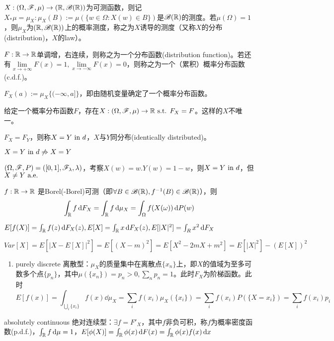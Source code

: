 \documentclass{ctexart}
\begin{document}
\begin{Eg}
  $X:(\Omega,\mathscr{F},\mu)\to(\mathbb{R},\mathscr{B}(\mathbb{R}))$为可测函数，则记$X_{*}\mu=\mu_{X}:\mu_{X}(B):=\mu(\{w\in\Omega:X(w)\in B\})$是$\mathscr{B}(\mathbb{R})$的测度。若$\mu(\Omega)=1$，则$\mu_{X}$为$(\mathbb{R},\mathscr{B}(\mathbb{R}))$上的概率测度，称之为$X$诱导的测度（又称$X$的分布(distribution)，$X$的law）。
\end{Eg}

\begin{Def}
  $F:\mathbb{R}\to\mathbb{R}$单调增，右连续，则称之为一个分布函数(distribution function)。若还有$\lim\limits_{x\to +\infty}F(x)=1,\lim\limits_{x\to -\infty}F(x)=0$，则称之为一个（累积）概率分布函数(c.d.f.)。

$F_{X}(a):=\mu_{X}\{(-\infty,a]\}$，即由随机变量确定了一个概率分布函数。
\end{Def}

\begin{Rmk}
  给定一个概率分布函数$F$，存在$X:(\Omega,\mathscr{F},\mu)\to\mathbb{R}\text{ s.t. } F_{X}=F$。这样的$X$不唯一。
\end{Rmk}

\begin{Def}
  $F_{X}=F_{Y}$，则称$X=Y\text{ in } d$，$X$与$Y$同分布(identically distributed)。
\end{Def}

$X=Y\text{ in } d\not\Rightarrow X=Y$
\begin{Eg}
  $(\Omega,\mathscr{F},P)=([0,1],\mathscr{F}_{\lambda},\lambda)$，考察$X(w)=w.Y(w)=1-w$，则$X=Y\text{ in } d$，但$X\neq Y\text{ a.e. }$
\end{Eg}

\begin{Thm}
  $f:\mathbb{R}\to\mathbb{R}$ 是Borel(-Borel)可测（即$\forall B\in \mathscr{B}(\mathbb{R}),f^{-1}(B)\in\mathscr{B}(\mathbb{R})$），则
  \[\int_{\mathbb{R}}f\,\mathrm{d} F_{X}=\int_{\mathbb{R}}f\,\mathrm{d}\mu_{X} =\int_{\Omega}f(X(\omega))\,\mathrm{d} P(w)\]
\end{Thm}

\begin{Eg}
  $E[f(X)]=\int_{\mathbb{R}}f(z)\,\mathrm{d} F_{X}(z), E[X]=\int_{\mathbb{R}}x\,\mathrm{d} F_{X}(z), E[|X|^{2}]=\int_{R}x^{2}\,\mathrm{d} F_{X}$

  $Var[X]=E[|X-E[X]|^{2}]=E[(X-m)^{2}]=E[X^{2}-2mX+m^{2}]=E[|X|^{2}]-(E[X])^{2}$
\end{Eg}

\begin{Eg}
  \begin{enumerate}
  \item purely discrete 离散型：$\mu_{X}$的质量集中在离散点$\{x_{n}\}$上，即$X$的值域为至多可数多个点$\{p_{n}\}$，其中$\mu(\{x_{n}\})=p_{n}>0,\sum_{n}p_{n}=1$。此时$F_{X}$为阶梯函数。此时
    \[E[f(x)]=\int_{\bigcup_{i}\{x_{i}\}}f(x)\dd\mu_{X}=\sum_{i}f(x_{i})\mu_{X}(\{x_{i}\})=\sum_{i}f(x_{i})P(\{X=x_{i}\})=\sum_{i}f(x_{i})p_{i}\]
  \end{enumerate}
\item absolutely continuous 绝对连续型：$\exists f=F'_{X}$，其中$f$非负可积，称$f$为概率密度函数(p.d.f.)，$\int_{\mathbb{R}}f\,\mathrm{d}\mu=1$，$E[\phi(X)]=\int_{\mathbb{R}}\phi(x)\,\mathrm{d} F(x)=\int_{\mathbb{R}}\phi(x)f(x)\,\mathrm{d} x$
\end{Eg}
\end{document}
